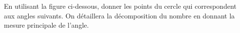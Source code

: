 \documentclass[11pt,a4paper]{article}  %
\begin{document}
	\graphicspath{{images/}}
	
	\begin{center}
		
		
		\fbox{
			\begin{minipage}[]{15cm}
				\begin{center}
					\LARGE{\rule{0.5cm}{0pt}\rule[-0.25cm]{0pt}{0.9cm}
						\textcolor{red}{Chapitre 02 - Trigonométrie\\
						Correction des exercices obligatoires}
					}
				\end{center}
			\end{minipage}
		}
	\end{center}



En utilisant la figure ci-dessous, donner les points du cercle qui correspondent aux angles suivants. On détaillera la décomposition du nombre en donnant la mesure principale de l'angle.
\end{document}
